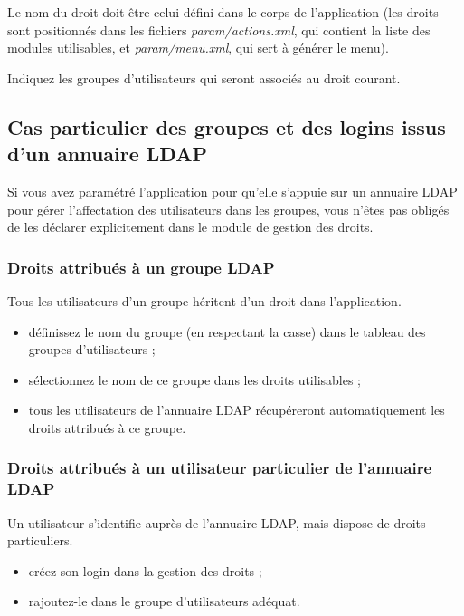 Le nom du droit doit être celui défini dans le corps de l'application (les droits sont positionnés dans les fichiers \textit{param/actions.xml}, qui contient la liste des modules utilisables, et \textit{param/menu.xml}, qui sert à générer le menu).

Indiquez les groupes d'utilisateurs qui seront associés au droit courant.

\subsection{Cas particulier des groupes et des logins issus d'un annuaire LDAP}

Si vous avez paramétré l'application pour qu'elle s'appuie sur un annuaire LDAP pour gérer l'affectation des utilisateurs dans les groupes, vous n'êtes pas obligés de les déclarer explicitement dans le module de gestion des droits.

\subsubsection{Droits attribués à un groupe LDAP}

Tous les utilisateurs d'un groupe héritent d'un droit dans l'application.

\begin{itemize}
\item définissez le nom du groupe (en respectant la casse) dans le tableau des groupes d'utilisateurs ;
\item sélectionnez le nom de ce groupe dans les droits utilisables ;
\item tous les utilisateurs de l'annuaire LDAP récupéreront automatiquement les droits attribués à ce groupe.
\end{itemize}

\subsubsection{Droits attribués à un utilisateur particulier de l'annuaire LDAP}

Un utilisateur s'identifie auprès de l'annuaire LDAP, mais dispose de droits particuliers.

\begin{itemize}
\item créez son login dans la gestion des droits ;
\item rajoutez-le dans le groupe d'utilisateurs adéquat.
\end{itemize}